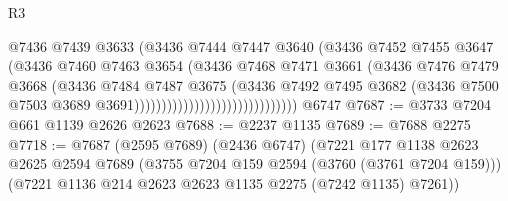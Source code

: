 \begin{lexlean}{R3}
\begin{coremodule}
                                                @7436
                                                @7439
                                                @3633
                                                (@3436
                                                  @7444
                                                  @7447
                                                  @3640
                                                  (@3436
                                                    @7452
                                                    @7455
                                                    @3647
                                                    (@3436
                                                      @7460
                                                      @7463
                                                      @3654
                                                      (@3436
                                                        @7468
                                                        @7471
                                                        @3661
                                                        (@3436
                                                          @7476
                                                          @7479
                                                          @3668
                                                          (@3436
                                                            @7484
                                                            @7487
                                                            @3675
                                                            (@3436
                                                              @7492
                                                              @7495
                                                              @3682
                                                              (@3436
                                                                @7500
                                                                @7503
                                                                @3689
                                                                @3691))))))))))))))))))))))))))))))
    @6747
@7687 := @3733 @7204 @661 @1139 @2626 @2623
@7688 := @2237 @1135
@7689 := @7688 @2275
@7718 := @7687
    (@2595 @7689)
    (@2436 @6747)
    (@7221
      @177
      @1138
      @2623
      @2625
      @2594
      @7689
      (@3755 @7204 @159 @2594 (@3760 (@3761 @7204 @159)))
      (@7221 @1136 @214 @2623 @2623 @1135 @2275 (@7242 @1135) @7261))

\end{coremodule}
\end{lexlean}
